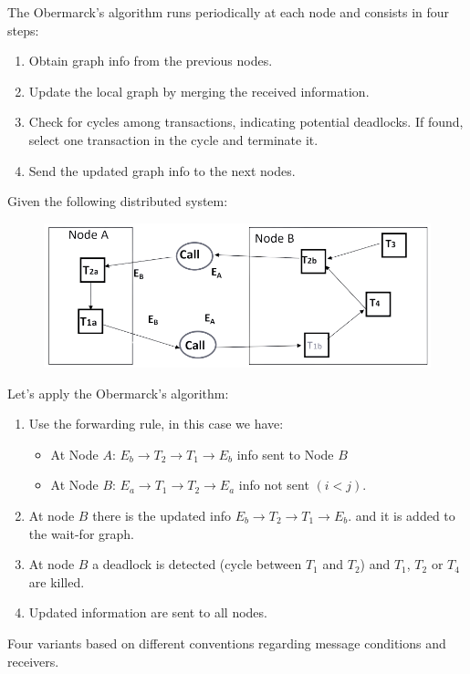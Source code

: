 The Obermarck's algorithm runs periodically at each node and consists in four steps: 
\begin{enumerate}
    \item Obtain graph info from the previous nodes.
    \item Update the local graph by merging the received information.
    \item Check for cycles among transactions, indicating potential deadlocks. 
        If found, select one transaction in the cycle and terminate it.
    \item Send the updated graph info to the next nodes.
\end{enumerate}
\begin{example}
    Given the following distributed system:
    \begin{figure}[H]
        \centering
        \includegraphics[width=0.5\linewidth]{images/distributedgraph.png}
    \end{figure}
    Let's apply the Obermarck's algorithm:
    \begin{enumerate}
        \item Use the forwarding rule, in this case we have: 
            \begin{itemize}
                \item At Node $A$: $E_b \rightarrow T_2 \rightarrow T_1 \rightarrow E_b$ info sent to Node $B$
                \item At Node $B$: $E_a \rightarrow T_1 \rightarrow T_2 \rightarrow E_a$ info not sent $(i<j)$. 
            \end{itemize}
        \item At node $B$ there is the updated info $E_b \rightarrow T_2 \rightarrow T_1 \rightarrow E_b$. and it is added to the wait-for graph.
        \item At node $B$ a deadlock is detected (cycle between $T_1$ and $T_2$) and $T_1$, $T_2$ or $T_4$ are killed. 
        \item Updated information are sent to all nodes. 
    \end{enumerate}
\end{example}
Four variants based on different conventions regarding message conditions and receivers.
